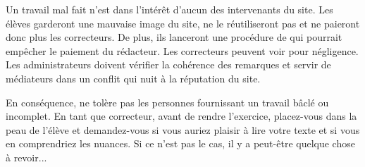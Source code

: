 ﻿Un travail mal fait n'est dans l'intérêt d'aucun des intervenants du site.
Les élèves garderont une mauvaise image du site, ne le réutiliseront pas et ne paieront donc plus les correcteurs. De plus, ils lanceront une procédure de  qui pourrait empêcher le paiement du rédacteur.
Les correcteurs peuvent voir  pour négligence.
Les administrateurs doivent vérifier la cohérence des remarques et servir de médiateurs dans un conflit qui nuit à la réputation du site.

En conséquence, \eDevoir ne tolère pas les personnes fournissant un travail bâclé ou incomplet. En tant que correcteur, avant de rendre l'exercice, placez-vous dans la peau de l'élève et demandez-vous si vous auriez plaisir à lire votre texte et si vous en comprendriez les nuances. Si ce n'est pas le cas, il y a peut-être quelque chose à revoir...
